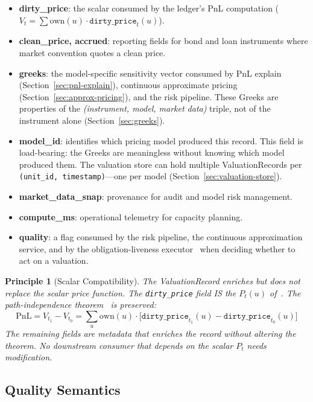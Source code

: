 \documentclass[11pt,a4paper]{article}
\newtheorem{principle}[definition]{Principle}
\begin{document}
\begin{itemize}[nosep]
\item \textbf{dirty\_price}: the scalar consumed by the ledger's PnL computation ($V_t = \sum \mathrm{own}(u) \cdot \texttt{dirty\_price}_t(u)$).
\item \textbf{clean\_price, accrued}: reporting fields for bond and loan instruments where market convention quotes a clean price.
\item \textbf{greeks}: the model-specific sensitivity vector consumed by PnL explain (Section~\ref{sec:pnl-explain}), continuous approximate pricing (Section~\ref{sec:approx-pricing}), and the risk pipeline.  These Greeks are properties of the \emph{(instrument, model, market data)} triple, not of the instrument alone (Section~\ref{sec:greeks}).
\item \textbf{model\_id}: identifies which pricing model produced this record.  This field is load-bearing: the Greeks are meaningless without knowing which model produced them.  The valuation store can hold multiple ValuationRecords per \texttt{(unit\_id, timestamp)}---one per model (Section~\ref{sec:valuation-store}).
\item \textbf{market\_data\_snap}: provenance for audit and model risk management.
\item \textbf{compute\_ms}: operational telemetry for capacity planning.
\item \textbf{quality}: a flag consumed by the risk pipeline, the continuous approximation service, and by the obligation-liveness executor~\cite[\S14.7]{ledger} when deciding whether to act on a valuation.
\end{itemize}

\begin{principle}[Scalar Compatibility]
\label{princ:scalar-compat}
The ValuationRecord enriches but does not replace the scalar price function.  The \texttt{dirty\_price} field IS the $P_t(u)$ of~\cite[\S4.1]{ledger}.  The path-independence theorem~\cite[\S4.3]{ledger} is preserved:
\[
\mathrm{PnL} = V_{t_1} - V_{t_0} = \sum_{u} \mathrm{own}(u) \cdot \bigl[\texttt{dirty\_price}_{t_1}(u) - \texttt{dirty\_price}_{t_0}(u)\bigr]
\]
The remaining fields are metadata that enriches the record without altering the theorem.  No downstream consumer that depends on the scalar $P_t$ needs modification.
\end{principle}

\subsection{Quality Semantics}
\end{document}
